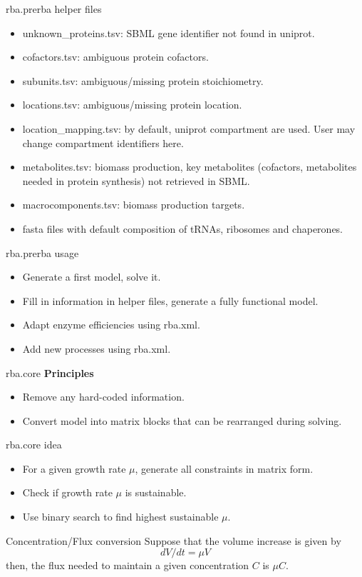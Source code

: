 \documentclass{beamer}
\begin{document}
\begin{frame}{rba.prerba helper files}
  \begin{itemize}
    \item unknown\_proteins.tsv: SBML gene identifier not found in uniprot.
    \item cofactors.tsv: ambiguous protein cofactors.
    \item subunits.tsv: ambiguous/missing protein stoichiometry.
    \item locations.tsv: ambiguous/missing protein location.
    \item location\_mapping.tsv: by default, uniprot compartment are used.
    User may change compartment identifiers here.
    \item metabolites.tsv: biomass production, key metabolites
    (cofactors, metabolites needed in protein synthesis) not retrieved in SBML.\@
    \item macrocomponents.tsv: biomass production targets.
    \item fasta files with default composition of tRNAs, ribosomes and
    chaperones.
  \end{itemize}
\end{frame}

\begin{frame}{rba.prerba usage}
  \begin{itemize}
    \item Generate a first model, solve it.
    \item Fill in information in helper files, generate a fully functional
    model.
    \item Adapt enzyme efficiencies using rba.xml.
    \item Add new processes using rba.xml.
  \end{itemize}
\end{frame}

\begin{frame}{rba.core}
  \textbf{Principles}
  \begin{itemize}
    \item Remove any hard-coded information.
    \item Convert model into matrix blocks that can be rearranged during
    solving.
  \end{itemize}
\end{frame}

\begin{frame}{rba.core idea}
  \begin{itemize}
    \item For a given growth rate $\mu$, generate all constraints in matrix
    form.
    \item Check if growth rate $\mu$ is sustainable.
    \item Use binary search to find highest sustainable $\mu$.
  \end{itemize}
  \begin{block}{Concentration/Flux conversion}
    Suppose that the volume increase is given by
    \[
      dV/dt = \mu V
    \]
    then, the flux needed to maintain a given concentration $C$ is
    $\mu C$.
  \end{block}
\end{frame}
\end{document}
